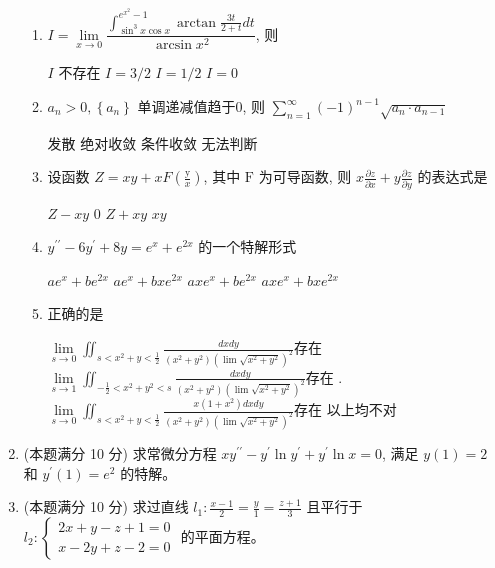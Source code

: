 \begin{enumerate}
\begin{enumerate}
\item 
$I=\lim\limits _{x \rightarrow 0} \dfrac{\int_{\sin ^{3} x \cos x}^{e^{x^{2}}-1} \arctan \frac{3 t}{2+t} d t}{\arcsin x^{2}}$, 则  

\fourchoices
{$I$ 不存在}
{$I=3 / 2$}
{$I=1 / 2$}
{$I=0$}

\item 
$a_{n}>0,\left\{a_{n}\right\}$ 单调递减值趋于$  0  $, 则 $\sum\limits_{n=1}^{\infty}(-1)^{n-1} \sqrt{a_{n} \cdot a_{n-1}}$  
 

\fourchoices
{发散}
{绝对收敛}
{条件收敛}
{无法判断}

\item 
设函数 $Z=x y+x F\left(\frac{\mathrm{y}}{x}\right)$, 其中 $\mathrm{F}$ 为可导函数, 则 $x \frac{\partial z}{\partial x}+y \frac{\partial z}{\partial y}$ 的表达式是  

\fourchoices
{$Z-x y$}
{$ 0 $}
{$Z+x y$}
{$x y$}

\item 
$y^{\prime \prime}-6 y^{\prime}+8 y=e^{x}+e^{2 x}$ 的一个特解形式  


\fourchoices
{$a e^{x}+b e^{2 x} $}
{$ a e^{x}+b x e^{2 x} $}
{$a x e^{x}+b e^{2x} $}
{$ a x e^{x}+b x e^{2 x}$}

\item 
正确的是  


\fourchoices
{$\lim\limits _{s \rightarrow 0} \iint_{s <x^{2}+y< \frac{ 1 }{ 2 } } \frac{d x d y}{\left(x^{2}+y^{2}\right)\left(\lim\limits \sqrt{x^{2}+y^{2}}\right)^{2}}$存在}
{$\lim\limits _{s \rightarrow 1} \iint_{-\frac{1}{2}<x^{2}+y^{2}<s} \frac{d x d y}{\left(x^{2}+y^{2}\right)\left(\lim\limits \sqrt{x^{2}+y^{2}}\right)^{2}} $存在}
{.$\lim\limits _{s \rightarrow 0} \iint_{s <x^{2}+y< \frac{ 1 }{ 2 } } \frac{x\left(1+x^{2}\right) d x d y}{\left(x^{2}+y^{2}\right)\left(\lim\limits \sqrt{x^{2}+y^{2}}\right)^{2}}$存在}
{以上均不对}




\end{enumerate}

	

\item 
(本题满分 10 分)
求常微分方程 $x y^{\prime \prime}-y^{\prime} \ln y^{\prime}+y^{\prime} \ln x=0$, 满足 $y(1)=2$ 和 $y^{\prime}(1)=e^{2}$ 的特解。




\item 
(本题满分 10 分)
求过直线 $l_{1}: \frac{x-1}{2}=\frac{y}{1}=\frac{z+1}{3}$ 且平行于 $l_{2}:\left\{\begin{array}{l}2 x+y-z+1=0 \\ x-2 y+z-2=0\end{array}\right.$ 的平面方程。


\end{enumerate}
